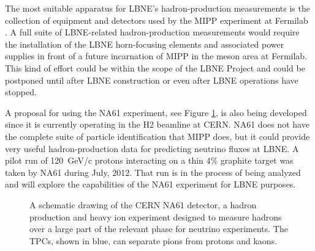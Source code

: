 The most suitable apparatus for LBNE's hadron-production measurements
is the collection of equipment and detectors used by the MIPP experiment at Fermilab~
\cite{Isenhower:2006zp}.   
A full suite of LBNE-related
hadron-production measurements would require the installation of the LBNE horn-focusing
elements and associated power supplies in front of a future
incarnation of MIPP in the meson area at Fermilab.
This kind of effort could be within the scope of the LBNE Project and could be postponed
until after LBNE construction or even after LBNE operations have
stopped. 

A proposal for using the NA61 experiment, see Figure \ref{fig:NA61Scheme}, 
is also being developed since it is currently operating
in the H2 beamline at CERN. NA61 does not have the complete suite of particle identification that MIPP does, but it could provide very useful hadron-production data for predicting neutrino fluxes at LBNE.
A pilot run of 120~GeV/c protons interacting on a thin 4\% graphite target 
was taken by NA61 during July, 2012. That run is in the process of being analyzed and will explore the capabilities of the NA61 experiment for LBNE purposes. 

\begin{figure}[htbp]
\centering
\caption[NA61]
{A schematic drawing of the CERN NA61 detector, a hadron production and heavy ion experiment 
designed to measure hadrons over a large part of the relevant phase for 
neutrino experiments. The TPCs, shown in blue, can separate pions from protons 
and kaons.}
\label{fig:NA61Scheme}
\end{figure}

